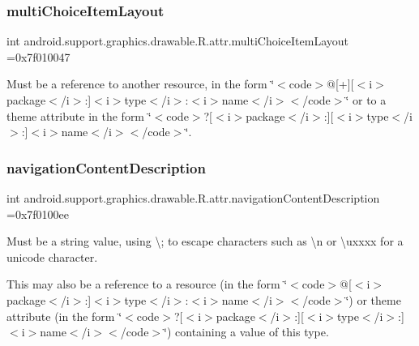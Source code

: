 \subsubsection{\texorpdfstring{multi\+Choice\+Item\+Layout}{multiChoiceItemLayout}}
{\footnotesize\ttfamily int android.\+support.\+graphics.\+drawable.\+R.\+attr.\+multi\+Choice\+Item\+Layout =0x7f010047\hspace{0.3cm}{\ttfamily [static]}}

Must be a reference to another resource, in the form \char`\"{}$<$code$>$@\mbox{[}+\mbox{]}\mbox{[}$<$i$>$package$<$/i$>$\+:\mbox{]}$<$i$>$type$<$/i$>$\+:$<$i$>$name$<$/i$>$$<$/code$>$\char`\"{} or to a theme attribute in the form \char`\"{}$<$code$>$?\mbox{[}$<$i$>$package$<$/i$>$\+:\mbox{]}\mbox{[}$<$i$>$type$<$/i$>$\+:\mbox{]}$<$i$>$name$<$/i$>$$<$/code$>$\char`\"{}. \mbox{\label{classandroid_1_1support_1_1graphics_1_1drawable_1_1R_1_1attr_a18672c039d1ab6b2ec83d54ddb8831fa}} 
\subsubsection{\texorpdfstring{navigation\+Content\+Description}{navigationContentDescription}}
{\footnotesize\ttfamily int android.\+support.\+graphics.\+drawable.\+R.\+attr.\+navigation\+Content\+Description =0x7f0100ee\hspace{0.3cm}{\ttfamily [static]}}

Must be a string value, using \textquotesingle{}\textbackslash{};\textquotesingle{} to escape characters such as \textquotesingle{}\textbackslash{}n\textquotesingle{} or \textquotesingle{}\textbackslash{}uxxxx\textquotesingle{} for a unicode character. 

This may also be a reference to a resource (in the form \char`\"{}$<$code$>$@\mbox{[}$<$i$>$package$<$/i$>$\+:\mbox{]}$<$i$>$type$<$/i$>$\+:$<$i$>$name$<$/i$>$$<$/code$>$\char`\"{}) or theme attribute (in the form \char`\"{}$<$code$>$?\mbox{[}$<$i$>$package$<$/i$>$\+:\mbox{]}\mbox{[}$<$i$>$type$<$/i$>$\+:\mbox{]}$<$i$>$name$<$/i$>$$<$/code$>$\char`\"{}) containing a value of this type. \mbox{\label{classandroid_1_1support_1_1graphics_1_1drawable_1_1R_1_1attr_a482f667b3d4e2b9b240008421b405fb2}} 
